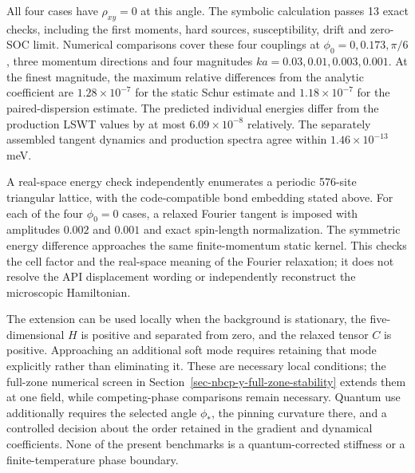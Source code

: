 All four cases have \(\rho_{xy}=0\) at this angle. The symbolic
calculation passes 13 exact checks, including the first moments, hard
sources, susceptibility, drift and zero-SOC limit. Numerical comparisons
cover these four couplings at \(\phi_0=0,0.173,\pi/6\), three momentum
directions and four magnitudes \(ka=0.03,0.01,0.003,0.001\). At the
finest magnitude, the maximum relative differences from the analytic
coefficient are \(1.28\times10^{-7}\) for the static Schur estimate and
\(1.18\times10^{-7}\) for the paired-dispersion estimate. The predicted
individual energies differ from the production LSWT values by at most
\(6.09\times10^{-8}\) relatively. The separately assembled tangent
dynamics and production spectra agree within \(1.46\times10^{-13}\) meV.

A real-space energy check independently enumerates a periodic 576-site
triangular lattice, with the code-compatible bond embedding stated
above. For each of the four \(\phi_0=0\) cases, a relaxed Fourier
tangent is imposed with amplitudes \(0.002\) and \(0.001\) and exact
spin-length normalization. The symmetric energy difference approaches
the same finite-momentum static kernel. This checks the cell factor and
the real-space meaning of the Fourier relaxation; it does not resolve
the API displacement wording or independently reconstruct the
microscopic Hamiltonian.

The extension can be used locally when the background is stationary, the
five-dimensional \(H\) is positive and separated from zero, and the
relaxed tensor \(C\) is positive. Approaching an additional soft mode
requires retaining that mode explicitly rather than eliminating it.
These are necessary local conditions; the full-zone numerical screen in
Section~\ref{sec-nbcp-y-full-zone-stability} extends them at one field,
while competing-phase comparisons remain necessary. Quantum use
additionally requires the selected angle \(\phi_*\), the pinning
curvature there, and a controlled decision about the order retained in
the gradient and dynamical coefficients. None of the present benchmarks
is a quantum-corrected stiffness or a finite-temperature phase boundary.
